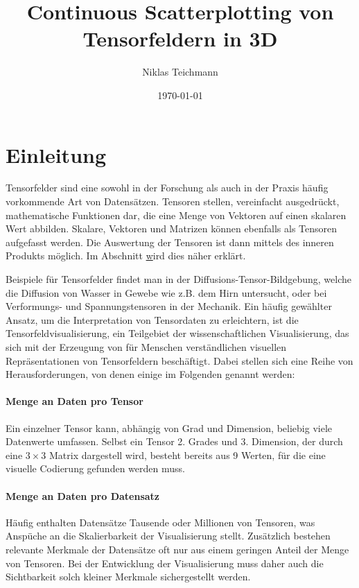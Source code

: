 \documentclass[a4paper,fontsize=12pt,toc=bib,halfparskip]{scrartcl}
\title{Continuous Scatterplotting von Tensorfeldern in 3D\xspace}
\author{Niklas Teichmann}
\date{\today}
\begin{document}
\maketitle\clearpage
\thispagestyle{empty}
\tableofcontents
\thispagestyle{empty}
\clearpage



\section{Einleitung}
Tensorfelder sind eine sowohl in der Forschung als auch in der Praxis h\"aufig vorkommende Art von Datens\"atzen. Tensoren stellen, vereinfacht ausgedr\"uckt, mathematische Funktionen dar, die eine Menge von Vektoren auf einen skalaren Wert abbilden. Skalare, Vektoren und Matrizen können ebenfalls als Tensoren aufgefasst werden. Die Auswertung der Tensoren ist dann mittels des inneren Produkts möglich. Im Abschnitt \hyperref[sec:Grundlagen] wird dies näher erklärt.

Beispiele f\"ur Tensorfelder findet man in der Diffusions-Tensor-Bildgebung\cite{basser1994mr}, welche die Diffusion von Wasser in Gewebe wie z.B. dem Hirn untersucht, oder bei Verformungs-\cite[S.~122]{FundamentalsofStructuralMechanics} und Spannungstensoren\cite[S.~154]{FundamentalsofStructuralMechanics} in der Mechanik. Ein h\"aufig gew\"ahlter Ansatz, um die Interpretation von Tensordaten zu erleichtern, ist die Tensorfeldvisualisierung, ein Teilgebiet der wissenschaftlichen Visualisierung, das sich mit der Erzeugung von f\"ur Menschen verst\"andlichen visuellen Repr\"asentationen von Tensorfeldern besch\"aftigt. Dabei stellen sich eine Reihe von Herausforderungen, von denen einige im Folgenden genannt werden\cite{hlawitschka2014top}\cite{fritzsch2016continuousScatterplot}:

\paragraph{Menge an Daten pro Tensor}
Ein einzelner Tensor kann, abh\"angig von Grad und Dimension, beliebig viele Datenwerte umfassen. Selbst ein Tensor 2. Grades und 3. Dimension, der durch eine $3 \times 3$ Matrix dargestell wird, besteht bereits aus 9 Werten, f\"ur die eine visuelle Codierung gefunden werden muss.

\paragraph{Menge an Daten pro Datensatz}
H\"aufig enthalten Datens\"atze Tausende oder Millionen von Tensoren, was Ansp\"uche an die Skalierbarkeit der Visualisierung stellt. Zus\"atzlich bestehen relevante Merkmale der Datens\"atze oft nur aus einem geringen Anteil der Menge von Tensoren. Bei der Entwicklung der Visualisierung muss daher auch die Sichtbarkeit solch kleiner Merkmale sichergestellt werden.
\end{document}
